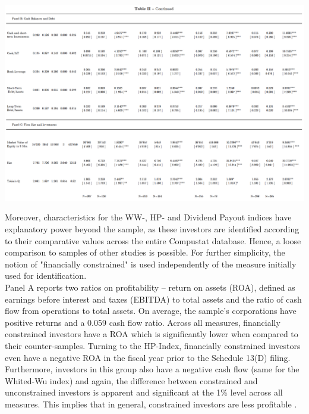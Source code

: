 \documentclass[12pt]{article}
\begin{document}
\begin{table}
	\centering
	\begin{adjustbox}{width=\textwidth}
		\includegraphics{Summary}
	\end{adjustbox}
\end{table}
\noindent Moreover, characteristics for the WW-, HP- and Dividend Payout indices have explanatory power beyond the sample, as these investors are identified according to their comparative values across the entire Compustat database. 
%
Hence, a loose comparison to samples of other studies is possible. For further simplicity, the notion of "financially constrained" is used independently of the measure initially used for identification. \\
Panel A reports two ratios on profitability -- return on assets (ROA), defined as earnings before interest and taxes (EBITDA) to total assets and the ratio of cash flow from operations to total assets. On average, the sample's corporations have positive returns and a 0.059 cash flow ratio. Across all measures, financially constrained investors have a ROA which is significantly lower when compared to their counter-samples. Turning to the HP-Index, financially constrained investors even have a negative ROA in the fiscal year prior to the Schedule 13(D) filing. Furthermore, investors in this group also have a negative cash flow (same for the Whited-Wu index) and again, the difference between constrained and unconstrained investors is apparent and significant at the 1\% level across all measures. This implies that in general, constrained investors are less profitable \citep[p.544]{Whited2006}.\\
\end{document}
